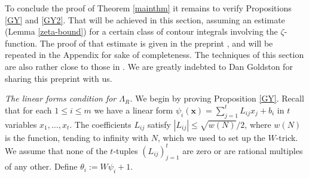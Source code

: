 \documentclass[12pt,a4paper,reqno]{amsart}
\numberwithin{equation}{section}
\theoremstyle{plain}
\theoremstyle{definition}
\renewcommand{\leq}{\leqslant}
\def\w{w}
\def\vs{\vspace{11pt}}
\def\ni{\noindent}
\begin{document}
\ni To conclude the proof of Theorem \ref{mainthm} it remains to verify
Propositions \ref{GY} and \ref{GY2}.  That will be achieved in this section, assuming an estimate (Lemma \ref{zeta-bound}) for a certain class of contour integrals involving the $\zeta$-function. The proof of that estimate is given in the preprint \cite{goldston-yildirim}, and will be repeated in the Appendix for sake of completeness. 
The techniques of this section are also rather close to those in \cite{goldston-yildirim}.  We are greatly indebted to Dan Goldston for sharing this preprint with us.\vspace{11pt}

\noindent\textit{The linear forms condition for $\Lambda_R$.} We begin by proving Proposition \ref{GY}.
Recall that for each $1 \leq i \leq m$ we have a linear form
$\psi_i(\mathbf{x}) = \sum_{j=1}^t L_{ij} x_j + b_i$ in $t$ variables $x_1,\dots,x_t$. The coefficients $L_{ij}$ satisfy $|L_{ij}| \leq \sqrt{\w(N)}/2$, where $\w(N)$ is the function, tending to infinity with $N$, which we used to set up the $W$-trick. We assume that none of the $t$-tuples $(L_{ij})_{j=1}^t$ are zero or are rational multiples of any other. Define $\theta_i := W\psi_i + 1$. \vs
\end{document}
